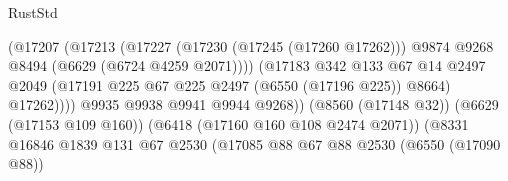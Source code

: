 \begin{lexlean}{RustStd}
\begin{coremodule}
                                                    (@17207
                                                      (@17213
                                                        (@17227
                                                          (@17230 (@17245 (@17260 @17262)))
                                                          @9874
                                                          @9268
                                                          @8494
                                                          (@6629 (@6724 @4259 @2071))))
                                                      (@17183
                                                        @342
                                                        @133
                                                        @67
                                                        @14
                                                        @2497
                                                        @2049
                                                        (@17191
                                                          @225
                                                          @67
                                                          @225
                                                          @2497
                                                          (@6550 (@17196 @225))
                                                          @8664)
                                                        @17262))))
                                                @9935
                                                @9938
                                                @9941
                                                @9944
                                                @9268))
                                            (@8560 (@17148 @32))
                                            (@6629 (@17153 @109 @160))
                                            (@6418 (@17160 @160 @108 @2474 @2071))
                                            (@8331
                                              @16846
                                              @1839
                                              @131
                                              @67
                                              @2530
                                              (@17085
                                                @88
                                                @67
                                                @88
                                                @2530
                                                (@6550 (@17090 @88))

\end{coremodule}
\end{lexlean}
